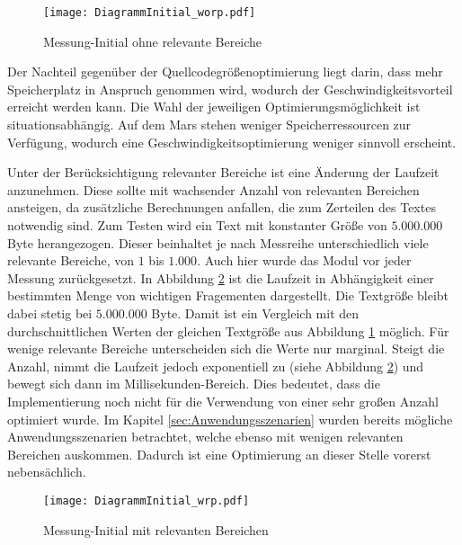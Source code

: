 \begin{figure}[H]
	\centering
	\texttt{[image: DiagrammInitial\_worp.pdf]}
	\caption{Messung-Initial ohne relevante Bereiche}
	\label{fig:diagrammInitial_worp}	
\end{figure}

Der Nachteil gegenüber der Quellcodegrößenoptimierung liegt darin, dass
mehr Speicherplatz in Anspruch genommen wird, wodurch der
Geschwindigkeitsvorteil erreicht werden kann.
Die Wahl der jeweiligen Optimierungsmöglichkeit ist situationsabhängig. Auf dem
Mars stehen weniger Speicherressourcen zur Verfügung, wodurch eine
Geschwindigkeitsoptimierung weniger sinnvoll erscheint.

Unter der Berücksichtigung relevanter Bereiche ist eine Änderung der Laufzeit
anzunehmen. Diese sollte mit wachsender Anzahl von relevanten Bereichen
ansteigen, da zusätzliche Berechnungen anfallen, die zum Zerteilen des Textes
notwendig sind.
\newline
Zum Testen wird ein Text mit konstanter Größe von $5.000.000$ Byte
herangezogen. Dieser beinhaltet je nach Messreihe unterschiedlich viele
relevante Bereiche, von $1$ bis $1.000$. Auch hier wurde das Modul vor jeder
Messung zurückgesetzt.
\newline
In Abbildung \ref{fig:diagrammInitial_wrp} ist die Laufzeit in
Abhängigkeit einer bestimmten Menge von wichtigen Fragementen dargestellt.
Die Textgröße bleibt dabei stetig bei $5.000.000$ Byte. Damit ist ein Vergleich mit den
durchschnittlichen Werten der gleichen Textgröße aus Abbildung
\ref{fig:diagrammInitial_worp} möglich. Für wenige relevante Bereiche
unterscheiden sich die Werte nur marginal. Steigt die Anzahl, nimmt die Laufzeit
jedoch exponentiell zu (siehe Abbildung \ref{fig:diagrammInitial_wrp}) und
bewegt sich dann im Millisekunden-Bereich. Dies bedeutet, dass die Implementierung noch
nicht für die Verwendung von einer sehr großen Anzahl optimiert wurde. Im
Kapitel \ref{sec:Anwendungsszenarien} wurden bereits mögliche
Anwendungsszenarien betrachtet, welche ebenso mit wenigen relevanten Bereichen
auskommen. Dadurch ist eine Optimierung an dieser Stelle vorerst nebensächlich.

\begin{figure}[H]
	\centering
	\texttt{[image: DiagrammInitial\_wrp.pdf]}
	\caption{Messung-Initial mit relevanten Bereichen}
	\label{fig:diagrammInitial_wrp}
\end{figure}

